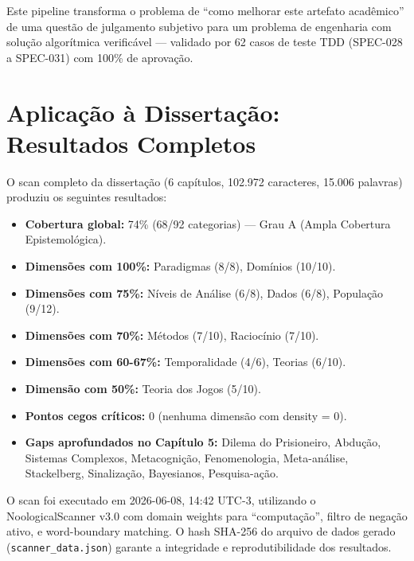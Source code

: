 Este pipeline transforma o problema de ``como melhorar este artefato acadêmico'' de uma questão de julgamento subjetivo para um problema de engenharia com solução algorítmica verificável --- validado por 62 casos de teste TDD (SPEC-028 a SPEC-031) com 100\% de aprovação.

\section{Aplicação à Dissertação: Resultados Completos}

O scan completo da dissertação (6 capítulos, 102.972 caracteres, 15.006 palavras) produziu os seguintes resultados:

\begin{itemize}
  \item \textbf{Cobertura global:} 74\% (68/92 categorias) --- Grau A (Ampla Cobertura Epistemológica).
  \item \textbf{Dimensões com 100\%:} Paradigmas (8/8), Domínios (10/10).
  \item \textbf{Dimensões com 75\%:} Níveis de Análise (6/8), Dados (6/8), População (9/12).
  \item \textbf{Dimensões com 70\%:} Métodos (7/10), Raciocínio (7/10).
  \item \textbf{Dimensões com 60-67\%:} Temporalidade (4/6), Teorias (6/10).
  \item \textbf{Dimensão com 50\%:} Teoria dos Jogos (5/10).
  \item \textbf{Pontos cegos críticos:} 0 (nenhuma dimensão com density = 0).
  \item \textbf{Gaps aprofundados no Capítulo 5:} Dilema do Prisioneiro, Abdução, Sistemas Complexos, Metacognição, Fenomenologia, Meta-análise, Stackelberg, Sinalização, Bayesianos, Pesquisa-ação.
\end{itemize}

O scan foi executado em 2026-06-08, 14:42 UTC-3, utilizando o NoologicalScanner v3.0 com domain weights para ``computação'', filtro de negação ativo, e word-boundary matching. O hash SHA-256 do arquivo de dados gerado (\texttt{scanner\_data.json}) garante a integridade e reprodutibilidade dos resultados.

\newpage
